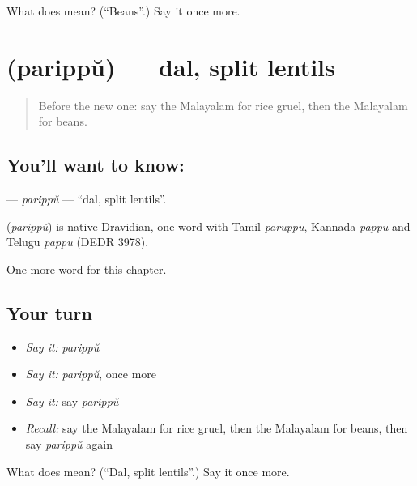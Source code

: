 \begin{tcolorbox}[breakable,colback=teal!4,colframe=teal!35!black,title={Before you move on}]
What does  mean? (\textquotedblleft{}Beans\textquotedblright{}.) Say it once more.
\end{tcolorbox}
\section[\texorpdfstring{\ml{പരിപ്പ്} (parippŭ)}{പരിപ്പ് (parippŭ)}]{ (parippŭ) — dal, split lentils}

\label{lesson:ML-C163-parippu}



\begin{quote}
Before the new one: say the Malayalam for rice gruel, then the Malayalam for beans.
\end{quote}

\subsection*{You'll want to know: }
\textbf{} — \emph{parippŭ} — \textquotedblleft{}dal, split lentils\textquotedblright{}.

\begin{cousinweb}
\textbf{} (\emph{parippŭ}) is native Dravidian, one word with Tamil \emph{paruppu}, Kannada \emph{pappu} and Telugu \emph{pappu} (DEDR 3978).
\end{cousinweb}

\begin{grammarlens}[title={What you've built}]
One more word for this chapter.
\end{grammarlens}

\subsection*{Your turn}
\begin{itemize}
\raggedright
  \item \emph{Say it:} \emph{parippŭ}
  \item \emph{Say it:} \emph{parippŭ}, once more
  \item \emph{Say it:} say \emph{parippŭ}
  \item \emph{Recall:} say the Malayalam for rice gruel, then the Malayalam for beans, then say \emph{parippŭ} again
\end{itemize}

\begin{tcolorbox}[breakable,colback=teal!4,colframe=teal!35!black,title={Before you move on}]
What does  mean? (\textquotedblleft{}Dal, split lentils\textquotedblright{}.) Say it once more.
\end{tcolorbox}
